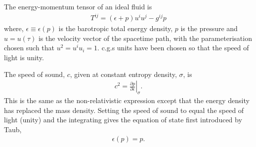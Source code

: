 \documentclass[10pt, fleqn,final,showtrims,oldfontcommands, article,a4paper,oneside]{memoir} %
\newcommand{\eqal}[2]{\begin{align}#1\label{eqn:#2}\end{align}}
\newcommand{\eqnref}[1]{\ref{eqn:#1}}
\newcommand{\epsillon}{\epsilon}
\renewcommand{\d}{\partial}
\newcommand{\given}[2]{ \left.{#1}\right|_{#2}  }
\begin{document}
The energy-momentum tensor of an ideal fluid is\cite{Doran2003}
\eqal{
  T^{i j} = (\epsilon + p) u^i u^j - g^{i j} p
}{EMtensor}
where, $\epsilon \equiv \epsilon(p)$ is the barotropic total energy density,
$p$ is the pressure
and 
$u=u(\tau)$ is the velocity vector of the spacetime path, with the parameterisation chosen such that $u^2 = u^i u_i = 1$. %
c.g.s units have been chosen  so that the speed of light is unity.

The speed of sound, $c$,  given at constant entropy density, $\sigma$, is\cite{LandauBook,Taub1978} 
\begin{align}
  c^2 = \given{\frac{\d p}{\d \epsillon}}{\sigma}. \label{eqn:soundspeed}
\end{align}
This is the same as the non-relativistic expression except that the energy density has replaced the mass density.
Setting the speed of sound to equal the speed of light (unity) and the integrating 
 gives
 the equation of state first introduced by Taub\cite{Taub1978},
\eqal{
  \epsilon(p) = p.
}{eos}

\end{document}
